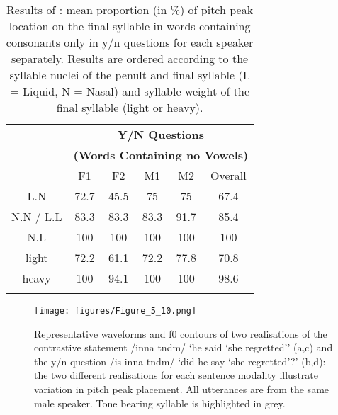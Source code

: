 \begin{table}
\centering
\caption{Results of \citet[250f.]{Grice.etal2015tash}: mean proportion (in \%) of pitch peak location on the final syllable in words containing consonants only in y/n questions for each speaker separately. Results are ordered according to the syllable nuclei of the penult and final syllable (L = Liquid, N = Nasal) and syllable weight of the final syllable (light or heavy).}
\label{tab:5.8}
\begin{tabular}{cccccc}
\lsptoprule
      & \multicolumn{5}{c}{\textbf{Y/N Questions}} \\ 
      & \multicolumn{5}{c}{\textbf{(Words Containing no Vowels)}} \\
\cmidrule {2-6}
          & F1        & F2        & M1        & M2             & Overall     \\
\midrule
L.N       & 72.7 & 45.5 & 75   & 75   &   67.4 \\
N.N / L.L & 83.3 & 83.3 & 83.3 & 91.7 &   85.4 \\
N.L       & 100  & 100  & 100  & 100  &   100  \\
\midrule
light     & 72.2 & 61.1 & 72.2 & 77.8 &   70.8 \\
heavy     & 100  & 94.1 & 100  & 100  &   98.6 \\
\lspbottomrule
\end{tabular}
\end{table}

  \begin{figure}
  \centering 
   \texttt{[image: figures/Figure\_5\_10.png]}
  \caption{Representative waveforms and f0 contours of two realisations of the contrastive statement /inna tndm/ ‘he said ‘she regretted’’ (a,c) and the y/n question /is inna tndm/ ‘did he say ‘she regretted’?’ (b,d): the two different realisations for each sentence modality illustrate variation in pitch peak placement. All utterances are from the same male speaker. Tone bearing syllable is highlighted in grey. }
   \label{fig:5.10}
   \end{figure}

